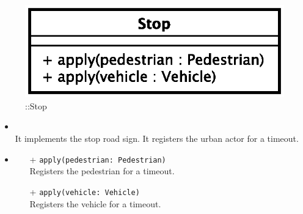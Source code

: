 \begin{figure}[h]
\centering
\includegraphics[scale=0.6,keepaspectratio]{images/solution/app/backend/stop.eps}
\caption{\pPassive::Stop}
\label{fig:sd-app-stop}
\end{figure}
\FloatBarrier
\begin{itemize}
  \item \textbf{\descr} \\
It implements the stop road sign. It registers the urban actor for a timeout.
  \item \textbf{\ops}
  \begin{itemize} 
  \item[+] \texttt{apply(pedestrian: Pedestrian)} \\
Registers the pedestrian for a timeout.
  \item[+] \texttt{apply(vehicle: Vehicle)} \\
Registers the vehicle for a timeout.
  \end{itemize}
\end{itemize}
